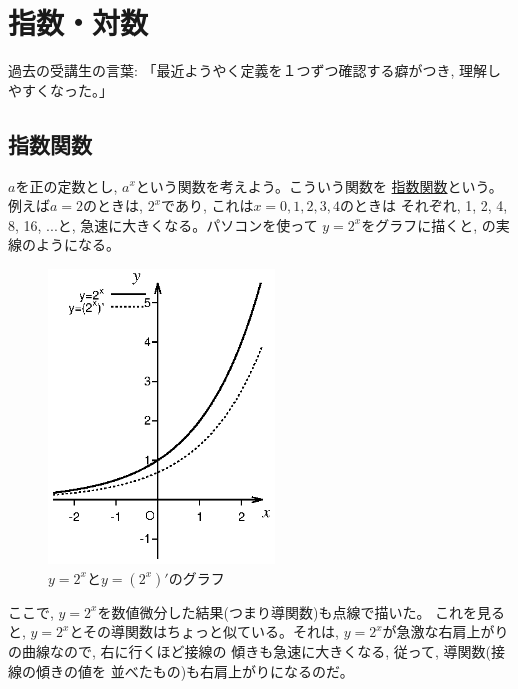 \chapter{指数・対数}\label{chapt_exp_log}
{\small 過去の受講生の言葉: 「最近ようやく定義を１つずつ確認する癖がつき, 理解しやすくなった。」}


\section{指数関数}

$a$を正の定数とし, $a^x$という関数を考えよう。こういう関数を
\underline{指数関数}という。例えば$a=2$のときは, 
$2^x$であり, これは$x=0, 1, 2, 3, 4$のときは
それぞれ, 1, 2, 4, 8, 16, ...と, 急速に大きくなる。パソコンを使って
$y=2^x$をグラフに描くと, の実線のようになる。
\begin{figure}[h]
    \centering
    \includegraphics[width=6.0cm]{y2powx.eps}
    \caption{$y=2^x$と$y=(2^x)'$のグラフ}\label{fig:y2powx}
\end{figure}
ここで, $y=2^x$を数値微分した結果(つまり導関数)も点線で描いた。
これを見ると, $y=2^x$とその導関数はちょっと似ている。それは, 
$y=2^x$が急激な右肩上がりの曲線なので, 右に行くほど接線の
傾きも急速に大きくなる, 従って, 導関数(接線の傾きの値を
並べたもの)も右肩上がりになるのだ。

